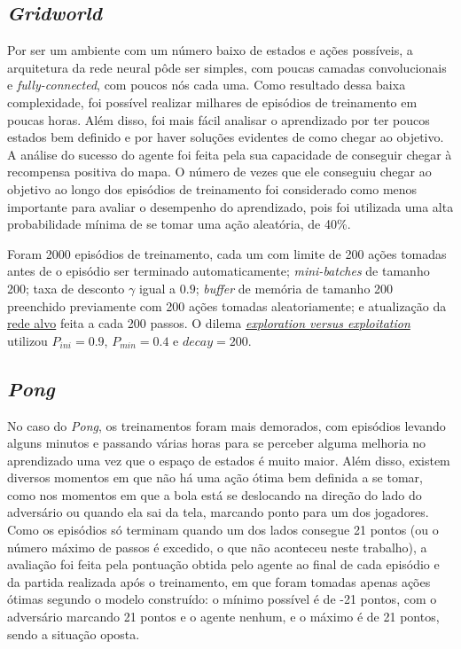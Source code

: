 \subsection{\textit{Gridworld}}
\label{sec:exp_gridworld}

Por ser um ambiente com um número baixo de estados e ações possíveis, a arquitetura da rede neural pôde ser simples, com poucas camadas convolucionais e \textit{fully-connected}, com poucos nós cada uma.
Como resultado dessa baixa complexidade, foi possível realizar milhares de episódios de treinamento em poucas horas.
Além disso, foi mais fácil analisar o aprendizado por ter poucos estados bem definido e por haver soluções evidentes de como chegar ao objetivo.
A análise do sucesso do agente foi feita pela sua capacidade de conseguir chegar à recompensa positiva do mapa.
O número de vezes que ele conseguiu chegar ao objetivo ao longo dos episódios de treinamento foi considerado como menos importante para avaliar o desempenho do aprendizado, pois foi utilizada uma alta probabilidade mínima de se tomar uma ação aleatória, de 40\%.


Foram 2000 episódios de treinamento, cada um com limite de 200 ações tomadas antes de o episódio ser terminado automaticamente;
\textit{mini-batches} de tamanho 200;
taxa de desconto $\gamma$ igual a $0.9$; 
\textit{buffer} de memória de tamanho 200 preenchido previamente com 200 ações tomadas aleatoriamente;
e atualização da \hyperref[sec:ft]{rede alvo} feita a cada 200 passos.
O dilema \hyperref[eq:exp_exp_prob]{\textit{exploration versus exploitation}} utilizou $P_{ini} = 0.9$, $P_{min} = 0.4$ e $decay = 200$.

\subsection{\textit{Pong}}
\label{sec:exp_pong}

No caso do \textit{Pong}, os treinamentos foram mais demorados, com episódios levando alguns minutos e passando várias horas para se perceber alguma melhoria no aprendizado uma vez que o espaço de estados é muito maior.
Além disso, existem diversos momentos em que não há uma ação ótima bem definida a se tomar, como nos momentos em que a bola está se deslocando na direção do lado do adversário ou quando ela sai da tela, marcando ponto para um dos jogadores.
Como os episódios só terminam quando um dos lados consegue 21 pontos (ou o número máximo de passos é excedido, o que não aconteceu neste trabalho), a avaliação foi feita pela pontuação obtida pelo agente ao final de cada episódio e da partida realizada após o treinamento, em que foram tomadas apenas ações ótimas segundo o modelo construído:
o mínimo possível é de -21 pontos, com o adversário marcando 21 pontos e o agente nenhum, e o máximo é de 21 pontos, sendo a situação oposta.

